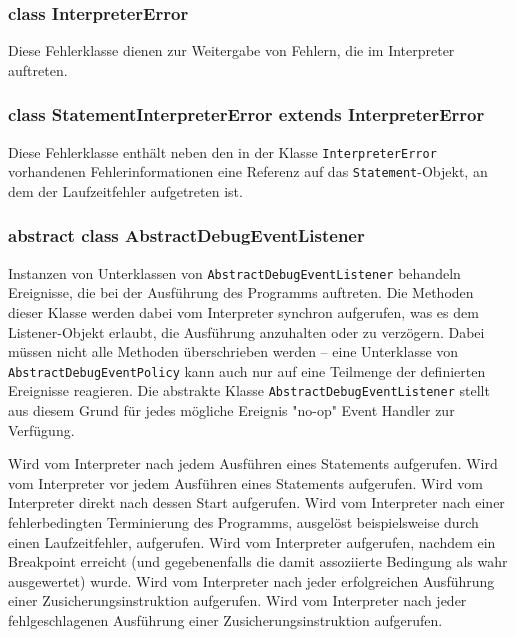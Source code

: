\subsubsection{class InterpreterError}
Diese Fehlerklasse dienen zur Weitergabe von Fehlern, die im Interpreter auftreten.

\subsubsection{class StatementInterpreterError extends InterpreterError}
Diese Fehlerklasse enthält neben den in der Klasse \texttt{InterpreterError} vorhandenen Fehlerinformationen eine Referenz auf das \texttt{Statement}-Objekt, an dem der Laufzeitfehler aufgetreten ist.

\subsubsection{abstract class AbstractDebugEventListener}
Instanzen von Unterklassen von \texttt{AbstractDebugEventListener} behandeln Ereignisse, die bei der Ausführung des Programms auftreten. Die Methoden dieser Klasse werden dabei vom Interpreter synchron aufgerufen, was es dem Listener-Objekt erlaubt, die Ausführung anzuhalten oder zu verzögern. Dabei müssen nicht alle Methoden überschrieben werden -- eine Unterklasse von \texttt{AbstractDebugEventPolicy} kann auch nur auf eine Teilmenge der definierten Ereignisse reagieren. Die abstrakte Klasse \texttt{AbstractDebugEventListener} stellt aus diesem Grund für jedes mögliche Ereignis "no-op" Event Handler zur Verfügung.

\begin{description}
    Wird vom Interpreter nach jedem Ausführen eines Statements aufgerufen.
    Wird vom Interpreter vor jedem Ausführen eines Statements aufgerufen.
    Wird vom Interpreter direkt nach dessen Start aufgerufen.
    Wird vom Interpreter nach einer fehlerbedingten Terminierung des Programms, ausgelöst beispielsweise durch einen Laufzeitfehler, aufgerufen.
    Wird vom Interpreter aufgerufen, nachdem ein Breakpoint erreicht (und gegebenenfalls die damit assoziierte Bedingung als wahr ausgewertet) wurde.
    Wird vom Interpreter nach jeder erfolgreichen Ausführung einer Zusicherungsinstruktion aufgerufen.
    Wird vom Interpreter nach jeder fehlgeschlagenen Ausführung einer Zusicherungsinstruktion aufgerufen.
\end{description}

